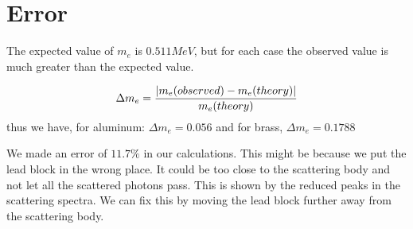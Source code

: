 \section{Error}
	The expected value of $m_e$ is $0.511MeV$, but for each case the observed value is much greater than the expected value.

	$$\Delta m_e = \frac{\abs{m_e(observed) -m_e(theory)}}{m_e(theory)}$$
	thus we have, for aluminum:
	$\Delta m_e = 0.056$
	and for brass,
	$\Delta m_e = 0.1788$

	\vspace{0.5cm}

	We made an error of $11.7\%$ in our calculations. This might be because we put the lead block in the wrong place. It could be too close to the scattering body and not let all the scattered photons pass. This is shown by the reduced peaks in the scattering spectra. We can fix this by moving the lead block further away from the scattering body.